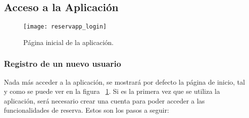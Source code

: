 \subsection{Acceso a la Aplicación}

\begin{figure}[H]
	\centering
		\texttt{[image: reservapp\_login]}
	\caption{Página inicial de la aplicación.}
	\label{fig:reservapp_login}
\end{figure}

\subsubsection{Registro de un nuevo usuario}
Nada más acceder a la aplicación, se mostrará por defecto la página de inicio, tal y como se puede ver en la figura ~\ref{fig:reservapp_login}. Si es la primera vez que se utiliza la aplicación, será necesario crear una cuenta para poder acceder a las funcionalidades de reserva. Estos son los pasos a seguir:

